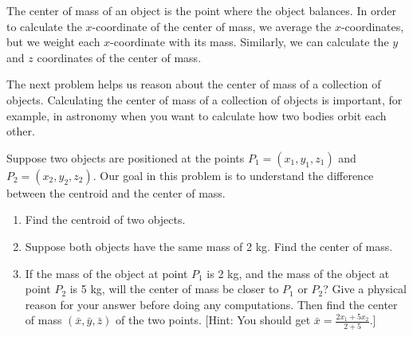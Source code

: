%
The center of mass of an object is the point where the object balances.  In order to calculate the $x$-coordinate of the center of mass, we average the $x$-coordinates, but we weight each $x$-coordinate with its mass.  Similarly, we can calculate the $y$ and $z$ coordinates of the center of mass.

The next problem helps us reason about the center of mass of a collection of objects.  Calculating the center of mass of a collection of objects is important, for example, in astronomy when you want to calculate how two bodies orbit each other.

\begin{problem}\label{center of mass with two points}%
 Suppose two objects are positioned at the points $P_1=(x_1,y_1,z_1)$ and $P_2=(x_2,y_2,z_2)$.
 Our goal in this problem is to understand the difference between the centroid and the center of mass.
\begin{enumerate}
\item Find the centroid of two objects.
 \item Suppose both objects have the same mass of 2 kg.  Find the center of mass.%
 \item If the mass of the object at point $P_1$ is 2 kg, and the mass of the object at point $P_2$ is 5 kg, will the center of mass be closer to $P_1$ or $P_2$? Give a physical reason for your answer before doing any computations.  Then find the center of mass $(\bar x, \bar y, \bar z)$ of the two points. [Hint: You should get $\bar x= \frac{2x_1+5x_2}{2+5}$.] 
\end{enumerate}
\end{problem}


